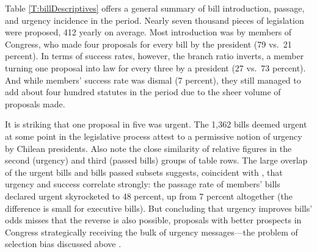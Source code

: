 \documentclass[letter,12pt]{article}
\begin{document}
Table \ref{T:billDescriptives} offers a general summary of bill introduction, passage, and urgency incidence in the period. Nearly seven thousand pieces of legislation were proposed, 412 yearly on average. Most introduction was by members of Congress, who made four proposals for every bill by the president (79 vs.\ 21 percent). In terms of success rates, however, the branch ratio inverts, a member turning one proposal into law for every three by a president (27 vs.\ 73 percent). And while members' success rate was dismal (7 percent), they still managed to add about four hundred statutes in the period due to the sheer volume of proposals made. 

It is striking that one proposal in five was urgent. The 1,362 bills deemed urgent at some point in the legislative process attest to a permissive notion of urgency by Chilean presidents. Also note the close similarity of relative figures in the second (urgency) and third (passed bills) groups of table rows. The large overlap of the urgent bills and bills passed subsets suggests, coincident with \citet{aleman.navia.UrgChi.2009}, that urgency and success correlate strongly: the passage rate of members' bills declared urgent skyrocketed to 48 percent, up from 7 percent altogether (the difference is small for executive bills). But concluding that urgency improves bills' odds misses that the reverse is also possible, proposals with better prospects in Congress strategically receiving the bulk of urgency messages---the problem of selection bias discussed above \citep[cf.][]{jacobson.kernell.1983}. 
\end{document}
